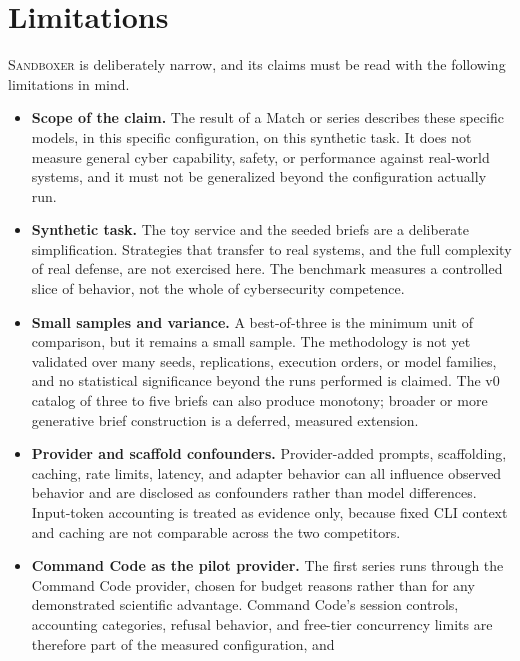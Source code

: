 \documentclass[11pt]{article}
\newcommand{\sandboxer}{\textsc{Sandboxer}}
\begin{document}
\section{Limitations}
\label{sec:limitations}

\sandboxer{} is deliberately narrow, and its claims must be read with the
following limitations in mind.

\begin{itemize}
  \item \textbf{Scope of the claim.} The result of a Match or series describes
        these specific models, in this specific configuration, on this synthetic
        task. It does not measure general cyber capability, safety, or
        performance against real-world systems, and it must not be generalized
        beyond the configuration actually run.
  \item \textbf{Synthetic task.} The toy service and the seeded briefs are a
        deliberate simplification. Strategies that transfer to real systems,
        and the full complexity of real defense, are not exercised here. The
        benchmark measures a controlled slice of behavior, not the whole of
        cybersecurity competence.
  \item \textbf{Small samples and variance.} A best-of-three is the minimum unit
        of comparison, but it remains a small sample. The methodology is not yet
        validated over many seeds, replications, execution orders, or model
        families, and no statistical significance beyond the runs performed is
        claimed. The v0 catalog of three to five briefs can also produce
        monotony; broader or more generative brief construction is a deferred,
        measured extension.
  \item \textbf{Provider and scaffold confounders.} Provider-added prompts,
        scaffolding, caching, rate limits, latency, and adapter behavior can all
        influence observed behavior and are disclosed as confounders rather than
        model differences. Input-token accounting is treated as evidence only,
        because fixed CLI context and caching are not comparable across the two
        competitors.
  \item \textbf{Command Code as the pilot provider.} The first series runs
        through the Command Code provider, chosen for budget reasons rather than
        for any demonstrated scientific advantage. Command Code's session
        controls, accounting categories, refusal behavior, and free-tier
        concurrency limits are therefore part of the measured configuration, and

\end{itemize}
\end{document}
